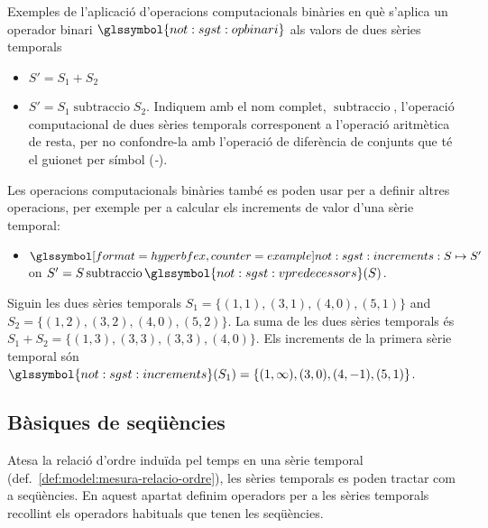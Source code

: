 \begin{example}
  Exemples de l'aplicació d'operacions computacionals binàries en què
  s'aplica un operador binari $ \glssymbol{not:sgst:opbinari}$ als
  valors de dues sèries temporals
  \begin{itemize}
  \item $S' = S_1 + S_2$ 
  \item $S' = S_1 \operatorname{subtraccio} S_2$. Indiquem amb el
    nom complet, $\operatorname{subtraccio}$, l'operació computacional
    de dues sèries temporals corresponent a l'operació aritmètica de
    resta, per no confondre-la amb l'operació de diferència de
    conjunts que té el guionet per símbol (\emph{-}).
  \end{itemize}
  
  Les operacions computacionals binàries també es poden usar per a
  definir altres operacions, per exemple per a calcular els increments de valor
  d'una sèrie temporal:
  \begin{itemize}
  \item $\glssymbolex{not:sgst:increments}: S \mapsto S'$ on $S'=
    S \operatorname{subtraccio} \glssymbol{not:sgst:vpredecessors}(S)$.
  \end{itemize}
\end{example}




\begin{example}
  Siguin les dues sèries temporals $S_1=\{(1,1),(3,1),(4,0),(5,1)\}$
  and $S_2=\{(1,2),(3,2),(4,0),(5,2)\}$. %
  La suma de les dues sèries temporals és
  $S_1+S_2=\{(1,3),(3,3),(3,3),(4,0)\}$. %
  Els increments de la primera sèrie temporal són
  $\glssymbol{not:sgst:increments}(S_1)=\{(1,\infty),(3,0),(4,-1),(5,1)\}$.
\end{example}




\subsection{Bàsiques de seqüències}


Atesa la relació d'ordre induïda pel temps en una sèrie temporal
(def.\ \ref{def:model:mesura-relacio-ordre}), les sèries temporals es
poden tractar com a seqüències.  En aquest apartat definim operadors
per a les sèries temporals recollint els operadors habituals que tenen
les seqüències. 

